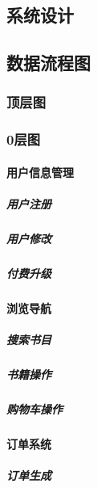 \documentclass{article}
\begin{document}
\begin{CJK*}{UTF8}{gbsn}

\chapter{系统设计}
\section{数据流程图}
\subsection{顶层图}
\subsection{0层图}
\subsubsection{用户信息管理}
\paragraph{用户注册}
\paragraph{用户修改}
\paragraph{付费升级}
\subsubsection{浏览导航}
\paragraph{搜索书目}
\paragraph{书籍操作}
\paragraph{购物车操作}
\subsubsection{订单系统}
\paragraph{订单生成}

\end{CJK*}
\end{document}

